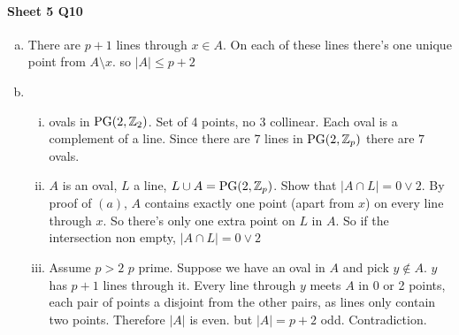 \documentclass[]{article}
\theoremstyle{definition}
\theoremstyle{remark}
\numberwithin{equation}{section}
\begin{document}
	\paragraph*{Sheet 5 Q10}
		\begin{enumerate}[(a)]
			\item There are $p+1$ lines through $x \in A$. On each of these lines there's one unique point from $A \setminus {x}$. so $|A| \leq p+2$

			\item 
				\begin{enumerate}[(i)]
					\item ovals in $\text{PG}(2, \mathbb{Z}_2)$. Set of 4 points, no 3 collinear. Each oval is a complement of a line. Since there are 7 lines in $\text{PG}(2, \mathbb{Z}_p)$ there are $7$ ovals.
					\item $A$ is an oval, $L$ a line, $L \cup A = \text{PG}(2, \mathbb{Z}_p)$. Show that $|A \cap L| = 0 \vee 2$. By proof of $(a)$, $A$ contains exactly one point (apart from $x$) on every line through $x$.
					So there's only one extra point on $L$ in $A$. So if the intersection non empty, $|A \cap L| = 0 \vee 2$
					\item Assume $p > 2$ $p$ prime.
					Suppose we have an oval in $A$ and pick $y \notin A$. $y$ has $p+1$ lines through it. Every line through $y$ meets $A$ in 0 or 2 points, each pair of points a disjoint from the other pairs, as lines only contain two points. Therefore $|A|$ is even. but $|A| = p + 2$ odd. Contradiction.

				\end{enumerate}
		\end{enumerate}
\end{document}
